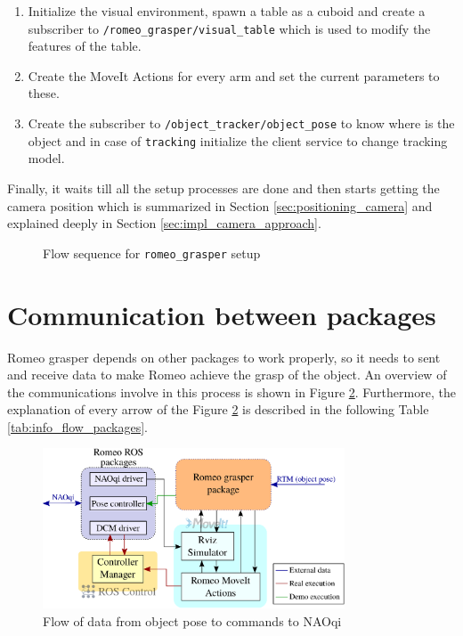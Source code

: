 \documentclass[12pt,a4paper,final,twoside,openright]{report}
\begin{document}
\begin{enumerate}
\item Initialize the visual environment, spawn a table as a cuboid and create a subscriber to \texttt{/romeo\_grasper/visual\_table} which is used to modify the features of the table.
\item Create the MoveIt Actions for every arm and set the current parameters to these.
\item Create the subscriber to \texttt{/object\_tracker/object\_pose} to know where is the object and in case of \texttt{tracking} initialize the client service to change tracking model.
\end{enumerate}

Finally, it waits till all the setup processes are done and then starts getting the camera position which is summarized in Section \ref{sec:positioning_camera} and explained deeply in Section \ref{sec:impl_camera_approach}.

\begin{figure}[!h]
\centering

\caption{Flow sequence for \texttt{romeo\_grasper} setup\label{fig:setup_romeo_grasper}}
\end{figure}

\newpage
\section{Communication between packages}

Romeo grasper depends on other packages to work properly, so it needs to sent and receive data to make Romeo achieve the grasp of the object. An overview of the communications involve in this process is shown in Figure \ref{fig:communication_all_packages}. Furthermore, the explanation of every arrow of the Figure \ref{fig:communication_all_packages} is described in the following Table \ref{tab:info_flow_packages}.

\begin{figure}[!h]
\centering
\includegraphics[width=0.8\textwidth]{images/move_control_overview.eps}
\caption{Flow of data from object pose to commands to NAOqi\label{fig:communication_all_packages}}
\end{figure}
\end{document}

